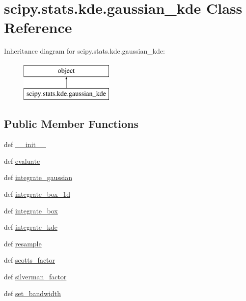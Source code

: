\hypertarget{classscipy_1_1stats_1_1kde_1_1gaussian__kde}{}\section{scipy.\+stats.\+kde.\+gaussian\+\_\+kde Class Reference}
\label{classscipy_1_1stats_1_1kde_1_1gaussian__kde}
Inheritance diagram for scipy.\+stats.\+kde.\+gaussian\+\_\+kde\+:\begin{figure}[H]
\begin{center}
\leavevmode
\includegraphics[height=2.000000cm]{classscipy_1_1stats_1_1kde_1_1gaussian__kde}
\end{center}
\end{figure}
\subsection*{Public Member Functions}
\begin{DoxyCompactItemize}
\item 
def \hyperlink{classscipy_1_1stats_1_1kde_1_1gaussian__kde_a1f2f6321606db43a79fa5f731b4d2e5d}{\+\_\+\+\_\+init\+\_\+\+\_\+}
\item 
def \hyperlink{classscipy_1_1stats_1_1kde_1_1gaussian__kde_a4c11bcd420ef6c0bd8cdf3d830f59cab}{evaluate}
\item 
def \hyperlink{classscipy_1_1stats_1_1kde_1_1gaussian__kde_ac717733cff5d6db8f95619a53bc599d3}{integrate\+\_\+gaussian}
\item 
def \hyperlink{classscipy_1_1stats_1_1kde_1_1gaussian__kde_a6903c7b8133672165725104da3a438cc}{integrate\+\_\+box\+\_\+1d}
\item 
def \hyperlink{classscipy_1_1stats_1_1kde_1_1gaussian__kde_a2eff8bd4f53dd6a124108b5b8d4610f5}{integrate\+\_\+box}
\item 
def \hyperlink{classscipy_1_1stats_1_1kde_1_1gaussian__kde_a23a1b59fd77308aa23fcdd4f859e8205}{integrate\+\_\+kde}
\item 
def \hyperlink{classscipy_1_1stats_1_1kde_1_1gaussian__kde_a6d17f47c334aa576f9f76d3eaa6cb180}{resample}
\item 
def \hyperlink{classscipy_1_1stats_1_1kde_1_1gaussian__kde_a8ca0e79f1ef67e1c6d44b0be28b2a73b}{scotts\+\_\+factor}
\item 
def \hyperlink{classscipy_1_1stats_1_1kde_1_1gaussian__kde_a8e85dee070dbd89a42ce43cbec1084a2}{silverman\+\_\+factor}
\item 
def \hyperlink{classscipy_1_1stats_1_1kde_1_1gaussian__kde_ab45443a62b816e3404c7fce2da735300}{set\+\_\+bandwidth}
\end{DoxyCompactItemize}
